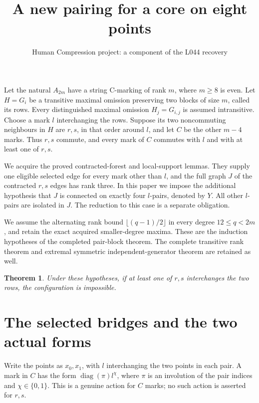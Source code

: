 \documentclass[11pt,a4paper]{article}
\title{A new pairing for a core on eight points}
\author{Human Compression project: a component of the L044 recovery}
\date{}
\newtheorem{theorem}[lemma]{Theorem}
\newcommand{\diag}{\operatorname{diag}}
\begin{document}
\maketitle

Let the natural $A_{2m}$ have a string C-marking of rank $m$,
where $m\ge8$ is even. Let $H=G_i$ be a transitive maximal
omission preserving two blocks of size $m$, called its rows.
Every distinguished maximal omission $H_j=G_{i,j}$ is assumed
intransitive. Choose a mark $l$ interchanging the rows. Suppose
its two noncommuting neighbours in $H$ are $r,s$, in that order
around $l$, and let $C$ be the other $m-4$ marks. Thus $r,s$
commute, and every mark of $C$ commutes with $l$ and with at
least one of $r,s$.

We acquire the proved contracted-forest and local-support lemmas.
They supply one eligible selected edge for every mark other than
$l$, and the full graph $J$ of the contracted $r,s$ edges has
rank three. In this paper we impose the additional hypothesis
that $J$ is connected on exactly four $l$-pairs, denoted by $Y$.
All other $l$-pairs are isolated in $J$. The reduction to this
case is a separate obligation.

We assume the alternating rank bound $\lfloor(q-1)/2\rfloor$
in every degree $12\le q<2m$, and retain the exact acquired
smaller-degree maxima. These are the induction hypotheses of
the completed pair-block theorem. The complete transitive rank
theorem and extremal symmetric independent-generator theorem
are retained as well.

\begin{theorem}\label{main}
Under these hypotheses, if at least one of $r,s$ interchanges
the two rows, the configuration is impossible.
\end{theorem}

\section*{The selected bridges and the two actual forms}
Write the points as $x_0,x_1$, with $l$ interchanging the two
points in each pair. A mark in $C$ has the form
$\diag(\pi)l^\chi$, where $\pi$ is an involution of the pair
indices and $\chi\in\{0,1\}$. This is a genuine action for
$C$ marks; no such action is asserted for $r,s$.
\end{document}
